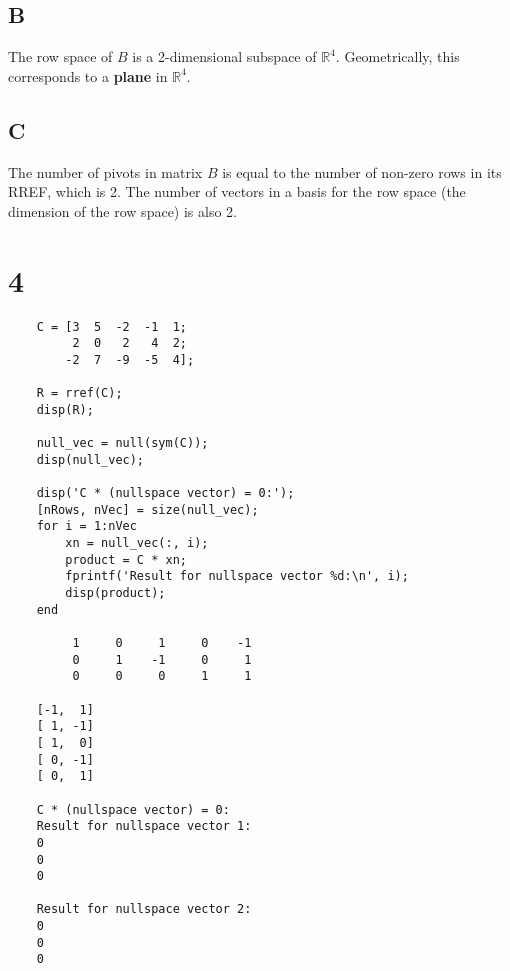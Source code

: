\documentclass{article}
\begin{document}
\subsection*{B}
The row space of \(B\) is a 2-dimensional subspace of \(\mathbb{R}^4\). Geometrically, this corresponds to a \textbf{plane} in \(\mathbb{R}^4\).

\subsection*{C}
The number of pivots in matrix \(B\) is equal to the number of non-zero rows in its RREF, which is 2. The number of vectors in a basis for the row space (the dimension of the row space) is also 2.


   \section*{4} 
\begin{verbatim}
	C = [3  5  -2  -1  1;
		 2  0   2   4  2;
		-2  7  -9  -5  4];
	
	R = rref(C);
	disp(R);
	
	null_vec = null(sym(C));
	disp(null_vec);
	
	disp('C * (nullspace vector) = 0:');
	[nRows, nVec] = size(null_vec);
	for i = 1:nVec
		xn = null_vec(:, i);
		product = C * xn;
		fprintf('Result for nullspace vector %d:\n', i);
		disp(product);
	end

		 1     0     1     0    -1
		 0     1    -1     0     1
		 0     0     0     1     1
	
	[-1,  1]
	[ 1, -1]
	[ 1,  0]
	[ 0, -1]
	[ 0,  1]
	 
	C * (nullspace vector) = 0:
	Result for nullspace vector 1:
	0
	0
	0
	 
	Result for nullspace vector 2:
	0
	0
	0
	 
\end{verbatim} 
\end{document}
